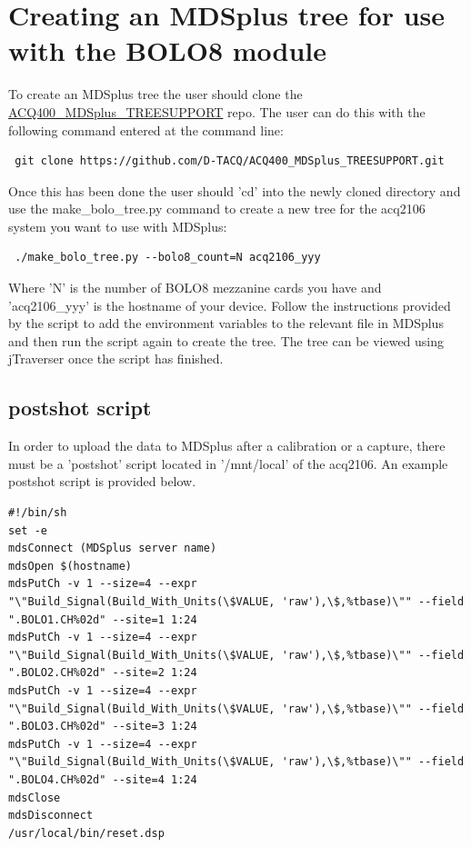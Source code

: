\documentclass{article}
\begin{document}
\section{Creating an MDSplus tree for use with the BOLO8 module}
To create an MDSplus tree the user should clone the  \href{https://github.com/D-TACQ/ACQ400_MDSplus_TREESUPPORT}{ACQ400\_MDSplus\_TREESUPPORT} repo. The user can do this with the following command entered at the command line: 

\begin{verbatim} git clone https://github.com/D-TACQ/ACQ400_MDSplus_TREESUPPORT.git \end{verbatim}

Once this has been done the user should 'cd' into the newly cloned directory and use the make\_bolo\_tree.py command to
create a new tree for the acq2106 system you want to use with MDSplus:

\begin{verbatim} ./make_bolo_tree.py --bolo8_count=N acq2106_yyy \end{verbatim}

Where 'N' is the number of BOLO8 mezzanine cards you have and 'acq2106\_yyy' is the hostname of your device. 
Follow the instructions provided by the script to add the environment variables to the relevant file in MDSplus
and then run the script again to create the tree. The tree can be viewed using jTraverser once the script has finished.

\subsection{postshot script}
In order to upload the data to MDSplus after a calibration or a capture, there must be a 'postshot' script located in 
'/mnt/local' of the acq2106. An example postshot script is provided below.


\begin{lstlisting}[breaklines]
#!/bin/sh
set -e
mdsConnect (MDSplus server name)
mdsOpen $(hostname)
mdsPutCh -v 1 --size=4 --expr "\"Build_Signal(Build_With_Units(\$VALUE, 'raw'),\$,%tbase)\"" --field ".BOLO1.CH%02d" --site=1 1:24
mdsPutCh -v 1 --size=4 --expr "\"Build_Signal(Build_With_Units(\$VALUE, 'raw'),\$,%tbase)\"" --field ".BOLO2.CH%02d" --site=2 1:24
mdsPutCh -v 1 --size=4 --expr "\"Build_Signal(Build_With_Units(\$VALUE, 'raw'),\$,%tbase)\"" --field ".BOLO3.CH%02d" --site=3 1:24
mdsPutCh -v 1 --size=4 --expr "\"Build_Signal(Build_With_Units(\$VALUE, 'raw'),\$,%tbase)\"" --field ".BOLO4.CH%02d" --site=4 1:24
mdsClose
mdsDisconnect
/usr/local/bin/reset.dsp
\end{lstlisting}
\end{document}
